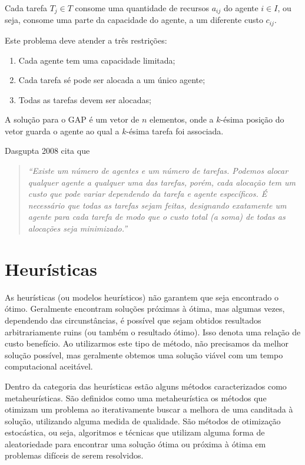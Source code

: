 \documentclass[12pt]{article}
\begin{document}
		Cada tarefa $T_j \in T$ consome uma quantidade de recursos $a_{ij}$ do agente $i \in I$, ou seja, consome uma parte da capacidade do agente, a um diferente custo $c_{ij}$.
		
		Este problema deve atender a três restrições:
		
		\begin{enumerate}
			\item Cada agente tem uma capacidade limitada;
			
			\item Cada tarefa sé pode ser alocada a um único agente;
			 
			\item Todas as tarefas devem ser alocadas;
		\end{enumerate}
		
		A solução para o GAP é um vetor de $n$ elementos, onde a $k$-ésima posição do vetor guarda o agente ao qual a $k$-ésima tarefa foi associada.
		
		Dasgupta 2008 cita que
		
		\begin{quotation}
			{\it ``Existe um número de agentes e um número de tarefas. Podemos alocar qualquer agente a qualquer uma das tarefas, porém, cada alocação tem um custo que pode variar dependendo da tarefa e agente específicos. É necessário que todas as tarefas sejam feitas, designando exatamente um agente para cada tarefa de modo que o custo total (a soma) de todas as alocações seja minimizado.''}
		\end{quotation}
		

\section{Heurísticas}
	As heurísticas (ou modelos heurísticos) não garantem que seja encontrado o ótimo. Geralmente encontram soluções próximas à ótima, mas algumas vezes, dependendo das circunstâncias, é possível que sejam obtidos resultados arbitrariamente ruins (ou também o resultado ótimo). Isso denota uma relação de custo benefício. Ao utilizarmos este tipo de método, não precisamos da melhor solução possível, mas geralmente obtemos uma solução viável com um tempo computacional aceitável.
	
	Dentro da categoria das heurísticas estão alguns métodos caracterizados como metaheurísticas. São definidos como uma metaheurística os métodos que otimizam um problema ao iterativamente buscar a melhora de uma canditada à solução, utilizando alguma medida de qualidade. São métodos de otimização estocástica, ou seja, algoritmos e técnicas que utilizam alguma forma de aleatoriedade para encontrar uma solução ótima ou próxima à ótima em problemas difíceis de serem resolvidos.
\end{document}
